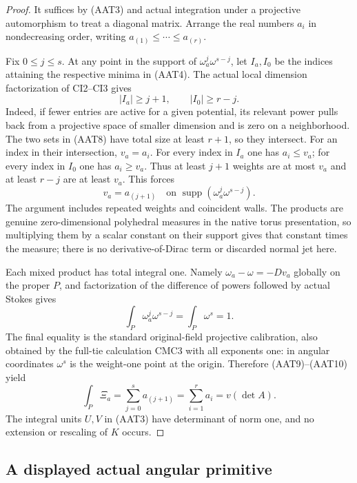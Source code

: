 \begin{proof}
It suffices by (AAT3) and actual integration under a
projective automorphism to treat a diagonal matrix.
Arrange the real numbers $a_i$ in nondecreasing order,
writing $a_{(1)}\le\cdots\le a_{(r)}$.

Fix $0\le j\le s$.  At any point in the support of
$\omega_a^j\omega^{s-j}$, let $I_a,I_0$ be the indices
attaining the respective minima in (AAT4).
The actual local dimension factorization of CI2--CI3
gives
\[
                         |I_a|\ge j+1,
                         \qquad |I_0|\ge r-j.
 \tag{AAT8}
\]
Indeed, if fewer entries are active for a given potential,
its relevant power pulls back from a projective space of
smaller dimension and is zero on a neighborhood.  The two
sets in (AAT8) have total size at least $r+1$, so they
intersect.  For an index in their intersection,
$v_a=a_i$.  For every index in $I_a$ one has $a_i\le v_a$;
for every index in $I_0$ one has $a_i\ge v_a$.
Thus at least $j+1$ weights are at most $v_a$ and at least
$r-j$ are at least $v_a$.  This forces
\[
                  v_a=a_{(j+1)}
             \quad\text{on }\operatorname{supp}
                                      (\omega_a^j\omega^{s-j}).
 \tag{AAT9}
\]
The argument includes repeated weights and coincident walls.
The products are genuine zero-dimensional polyhedral
measures in the native torus presentation, so multiplying
them by a scalar constant on their support gives that
constant times the measure; there is no derivative-of-Dirac
term or discarded normal jet here.

Each mixed product has total integral one.  Namely
$\omega_a-\omega=-Dv_a$ globally on the proper $P$,
and factorization of the difference of powers followed
by actual Stokes gives
\[
 \int_P\omega_a^j\omega^{s-j}=\int_P\omega^s=1.
 \tag{AAT10}
\]
The final equality is the standard original-field
projective calibration, also obtained by the full-tie
calculation CMC3 with all exponents one: in angular
coordinates $\omega^s$ is the weight-one point at the
origin.  Therefore (AAT9)--(AAT10) yield
\[
 \int_P\Xi_a=\sum_{j=0}^{s}a_{(j+1)}
            =\sum_{i=1}^r a_i=v(\det A).
\]
The integral units $U,V$ in (AAT3) have determinant of
norm one, and no extension or rescaling of $K$ occurs.
\end{proof}

\subsection{A displayed actual angular primitive}

